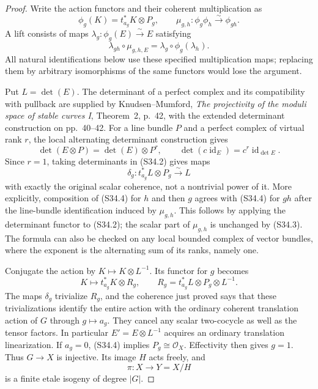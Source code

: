\documentclass[11pt,a4paper]{article}
\theoremstyle{definition}
\begin{document}
\begin{proof}
Write the action functors and their coherent multiplication
as
\[
 \phi_g(K)=t_{a_g}^*K\otimes P_g,
 \qquad
 \mu_{g,h}:\phi_g\phi_h\xrightarrow{\sim}\phi_{gh}.
\]
A lift consists of maps
$\lambda_g:\phi_g(E)\xrightarrow{\sim}E$ satisfying
\[
 \lambda_{gh}\circ\mu_{g,h,E}
       =\lambda_g\circ\phi_g(\lambda_h).
 \tag{S34.2}
\]
All natural identifications below use these specified
multiplication maps; replacing them by arbitrary
isomorphisms of the same functors would lose the argument.

Put $L=\det(E)$. The determinant of a perfect complex and
its compatibility with pullback are supplied by
Knudsen--Mumford, \emph{The projectivity of the moduli
space of stable curves I}, Theorem~2, p.~42, with the
extended determinant construction on pp.~40--42.
For a line bundle $P$ and a perfect complex of virtual
rank $r$, the local alternating determinant construction
gives
\[
 \det(E\otimes P)=\det(E)\otimes P^r,
 \qquad \det(c\operatorname{id}_E)=c^r\operatorname{id}_{\det E}.
 \tag{S34.3}
\]
Since $r=1$, taking determinants in (S34.2) gives maps
\[
 \delta_g:t_{a_g}^*L\otimes P_g\xrightarrow{\sim}L
 \tag{S34.4}
\]
with exactly the original scalar coherence, not a nontrivial
power of it. More explicitly, composition of (S34.4) for
$h$ and then $g$ agrees with (S34.4) for $gh$ after the
line-bundle identification induced by $\mu_{g,h}$.
This follows by applying the determinant functor to
(S34.2); the scalar part of $\mu_{g,h}$ is unchanged by
(S34.3). The formula can also be checked on any local
bounded complex of vector bundles, where the exponent
is the alternating sum of its ranks, namely one.

Conjugate the action by $K\mapsto K\otimes L^{-1}$.
Its functor for $g$ becomes
\[
 K\longmapsto t_{a_g}^*K\otimes R_g,
 \qquad
 R_g=t_{a_g}^*L\otimes P_g\otimes L^{-1}.
 \tag{S34.5}
\]
The maps $\delta_g$ trivialize $R_g$, and the coherence
just proved says that these trivializations identify the
entire action with the ordinary coherent translation action
of $G$ through $g\mapsto a_g$. They cancel any scalar
two-cocycle as well as the tensor factors. In particular
$E'=E\otimes L^{-1}$ acquires an ordinary translation
linearization. If $a_g=0$, (S34.4) implies $P_g\cong
\mathcal O_X$. Effectivity then gives $g=1$. Thus
$G\to X$ is injective. Its image $H$ acts freely, and
\[
 \pi:X\longrightarrow Y=X/H
 \tag{S34.6}
\]
is a finite etale isogeny of degree $|G|$.


\end{proof}
\end{document}
